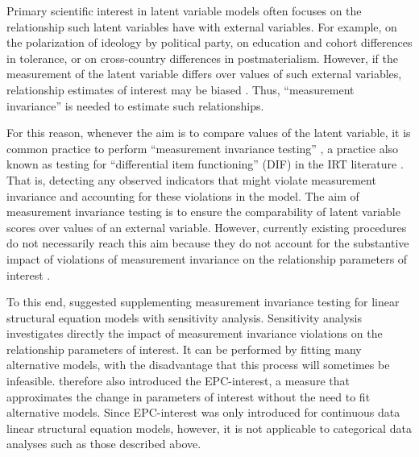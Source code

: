 \documentclass[letterpaper,12pt]{article}
\begin{document}

Primary scientific interest in latent variable models often focuses on the relationship such latent variables have with external variables. For example, on the polarization of ideology by political party, on education and cohort differences in tolerance, or on cross-country differences in postmaterialism. However, if the measurement of the latent variable differs over values of such external variables,  relationship estimates of interest may be biased \citep{steenkamp_assessing_1998}. Thus, ``measurement invariance'' is needed to estimate such relationships. 


For this reason, whenever the aim is to compare  values of the latent variable, it is common practice to perform ``measurement invariance testing''  \citep[see][for reviews]{vandenberg2000review,schmitt2008measurement}, a practice also known as  testing for ``differential item functioning'' (DIF) in the IRT literature \citep{Holland:1993aa}. That is, detecting any observed indicators that might violate measurement invariance and accounting for these violations in the model. The aim of measurement invariance testing is to ensure the comparability of latent variable scores over values of an external variable. However, currently existing procedures do not necessarily reach this aim because they do not account for the substantive impact of violations of measurement invariance on the relationship parameters of interest \citep{Oberski:WP:EPC-interest}. 


To this end, \citet{Oberski:WP:EPC-interest}  suggested supplementing measurement invariance testing for linear structural equation models with sensitivity analysis. Sensitivity analysis investigates directly the impact of measurement invariance violations on the relationship parameters of interest. It can be performed by fitting many alternative models, with the disadvantage that this process will sometimes be infeasible. \citet{Oberski:WP:EPC-interest} therefore also introduced the EPC-interest, a measure that approximates the change in parameters of interest without the need to fit alternative models. Since  EPC-interest was only introduced for continuous data linear structural equation models, however, it is not applicable to categorical data analyses such as those described above.
\end{document}
